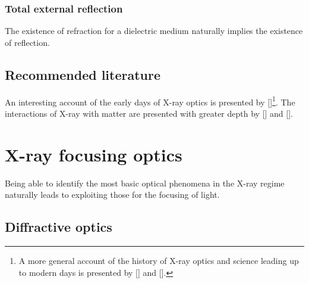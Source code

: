 \begin{refsection}
\subsubsection*{Total external reflection}

The existence of refraction for a dielectric medium naturally implies the existence of reflection. 

\subsection*{Recommended literature}

An interesting account of the early days of X-ray optics is presented by [\cite{Compton1928}]\footnote{A more general account of the history of X-ray optics and science leading up to modern days is presented by [\cite[\textit{§1}]{Willmott2019}] and [\cite[\textit{§2}]{Jacobsen2019}].}. The interactions of X-ray with matter are presented with greater depth by [\cite{Als-Nielsen2011}] and [\cite[\textit{§1} - \textit{\textit{§3}}]{Attwood2016}].

\section{X-ray focusing optics}

Being able to identify the most basic optical phenomena in the X-ray regime naturally leads to exploiting those for the focusing of light.

\subsection{Diffractive optics}


\end{refsection}
